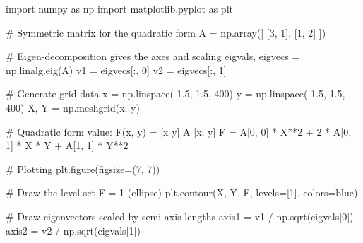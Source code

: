 \documentclass[
  letterpaper,
  DIV=11,
  numbers=noendperiod]{scrreprt}
\newenvironment{Shaded}{\begin{snugshade}}{\end{snugshade}}
\newcommand{\CommentTok}[1]{\textcolor[rgb]{0.37,0.37,0.37}{#1}}
\newcommand{\DecValTok}[1]{\textcolor[rgb]{0.68,0.00,0.00}{#1}}
\newcommand{\FloatTok}[1]{\textcolor[rgb]{0.68,0.00,0.00}{#1}}
\newcommand{\ImportTok}[1]{\textcolor[rgb]{0.00,0.46,0.62}{#1}}
\newcommand{\NormalTok}[1]{\textcolor[rgb]{0.00,0.23,0.31}{#1}}
\newcommand{\OperatorTok}[1]{\textcolor[rgb]{0.37,0.37,0.37}{#1}}
\newcommand{\StringTok}[1]{\textcolor[rgb]{0.13,0.47,0.30}{#1}}
\begin{document}
\begin{Shaded}
\begin{Highlighting}[]
\ImportTok{import}\NormalTok{ numpy }\ImportTok{as}\NormalTok{ np}
\ImportTok{import}\NormalTok{ matplotlib.pyplot }\ImportTok{as}\NormalTok{ plt}

\CommentTok{\# Symmetric matrix for the quadratic form}
\NormalTok{A }\OperatorTok{=}\NormalTok{ np.array([}
\NormalTok{    [}\DecValTok{3}\NormalTok{, }\DecValTok{1}\NormalTok{],}
\NormalTok{    [}\DecValTok{1}\NormalTok{, }\DecValTok{2}\NormalTok{]}
\NormalTok{])}

\CommentTok{\# Eigen{-}decomposition gives the axes and scaling}
\NormalTok{eigvals, eigvecs }\OperatorTok{=}\NormalTok{ np.linalg.eig(A)}
\NormalTok{v1 }\OperatorTok{=}\NormalTok{ eigvecs[:, }\DecValTok{0}\NormalTok{]}
\NormalTok{v2 }\OperatorTok{=}\NormalTok{ eigvecs[:, }\DecValTok{1}\NormalTok{]}

\CommentTok{\# Generate grid data}
\NormalTok{x }\OperatorTok{=}\NormalTok{ np.linspace(}\OperatorTok{{-}}\FloatTok{1.5}\NormalTok{, }\FloatTok{1.5}\NormalTok{, }\DecValTok{400}\NormalTok{)}
\NormalTok{y }\OperatorTok{=}\NormalTok{ np.linspace(}\OperatorTok{{-}}\FloatTok{1.5}\NormalTok{, }\FloatTok{1.5}\NormalTok{, }\DecValTok{400}\NormalTok{)}
\NormalTok{X, Y }\OperatorTok{=}\NormalTok{ np.meshgrid(x, y)}

\CommentTok{\# Quadratic form value: F(x, y) = [x y] A [x; y]}
\NormalTok{F }\OperatorTok{=}\NormalTok{ A[}\DecValTok{0}\NormalTok{, }\DecValTok{0}\NormalTok{] }\OperatorTok{*}\NormalTok{ X}\OperatorTok{**}\DecValTok{2} \OperatorTok{+} \DecValTok{2} \OperatorTok{*}\NormalTok{ A[}\DecValTok{0}\NormalTok{, }\DecValTok{1}\NormalTok{] }\OperatorTok{*}\NormalTok{ X }\OperatorTok{*}\NormalTok{ Y }\OperatorTok{+}\NormalTok{ A[}\DecValTok{1}\NormalTok{, }\DecValTok{1}\NormalTok{] }\OperatorTok{*}\NormalTok{ Y}\OperatorTok{**}\DecValTok{2}

\CommentTok{\# Plotting}
\NormalTok{plt.figure(figsize}\OperatorTok{=}\NormalTok{(}\DecValTok{7}\NormalTok{, }\DecValTok{7}\NormalTok{))}

\CommentTok{\# Draw the level set F = 1 (ellipse)}
\NormalTok{plt.contour(X, Y, F, levels}\OperatorTok{=}\NormalTok{[}\DecValTok{1}\NormalTok{], colors}\OperatorTok{=}\StringTok{\textquotesingle{}blue\textquotesingle{}}\NormalTok{)}

\CommentTok{\# Draw eigenvectors scaled by semi{-}axis lengths}
\NormalTok{axis1 }\OperatorTok{=}\NormalTok{ v1 }\OperatorTok{/}\NormalTok{ np.sqrt(eigvals[}\DecValTok{0}\NormalTok{])}
\NormalTok{axis2 }\OperatorTok{=}\NormalTok{ v2 }\OperatorTok{/}\NormalTok{ np.sqrt(eigvals[}\DecValTok{1}\NormalTok{])}


\end{Highlighting}
\end{Shaded}
\end{document}
